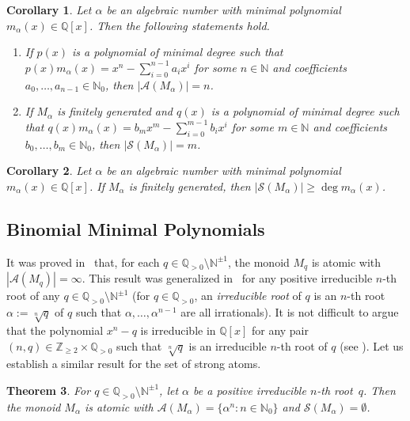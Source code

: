 \documentclass[11pt]{amsart}
\newtheorem{theorem}{Theorem}[section]
\newtheorem{corollary}[theorem]{Corollary}
\theoremstyle{definition}
\theoremstyle{remark}
\numberwithin{equation}{section}
\newcommand{\nn}{\mathbb{N}}
\newcommand{\N}{\mathbb{N}}
\newcommand{\qq}{\mathbb{Q}}
\newcommand{\zz}{\mathbb{Z}}
\begin{document}
\begin{corollary}\label{cor:minimal poly condition for atoms}
    Let $\alpha$ be an algebraic number with minimal polynomial $m_\alpha(x) \in \qq[x]$. Then the following statements hold.
    \begin{enumerate}
        \item If $p(x)$ is a polynomial of minimal degree such that $p(x)m_\alpha(x) = x^n - \sum_{i=0}^{n-1} a_i x^i$ for some $n \in \N$ and coefficients $a_0, \dots, a_{n-1} \in \N_0$, then $|\mathcal{A}(M_\alpha)| = n$.
        \smallskip
        
        \item If $M_\alpha$ is finitely generated and $q(x)$ is a polynomial of minimal degree such that  $q(x)m_\alpha(x) = b_m x^m - \sum_{i=0}^{m-1} b_i x^i$ for some $m \in \N$ and coefficients $b_0, \dots, b_m \in \N_0$, then $|\mathcal{S}(M_\alpha)| = m$.
    \end{enumerate}
\end{corollary}

\begin{corollary}\label{cor:more strong atoms than degree}
    Let $\alpha$ be an algebraic number with minimal polynomial $m_\alpha(x) \in \qq[x]$. If $M_\alpha$ is finitely generated, then $|\mathcal{S}(M_\alpha)| \ge \deg m_\alpha(x)$.
\end{corollary}

\medskip

\subsection{Binomial Minimal Polynomials}

It was proved in~\cite[Theorem~6.2]{GG18} that, for each $q \in \qq_{> 0} \setminus \nn^{\pm 1}$, the monoid $M_q$ is atomic with $|\mathcal{A}(M_q)| = \infty$. This result was generalized in~\cite[Proposition~3.9]{ABLST23} for any positive irreducible $n$-th root of any $q \in \qq_{> 0} \setminus \nn^{\pm 1}$ (for $q \in \qq_{> 0}$, an \emph{irreducible root} of $q$ is an $n$-th root $\alpha := \sqrt[n]{q}$ of $q$ such that $\alpha, \dots, \alpha^{n-1}$ are all irrationals). It is not difficult to argue that the polynomial $x^n - q$ is irreducible in $\qq[x]$ for any pair $(n,q) \in \zz_{\ge 2} \times \qq_{> 0}$ such that $\sqrt[n]{q}$ is an irreducible $n$-th root of $q$ (see \cite[page 297]{sL02}). Let us establish a similar result for the set of strong atoms.

\begin{theorem} \label{thm:strong atoms for irreducible n-th roots}
    For $q \in \qq_{> 0} \setminus \nn^{\pm 1}$, let $\alpha$ be a positive irreducible $n$-th root~$q$. Then the monoid $M_\alpha$ is atomic with $\mathcal{A}(M_\alpha) = \{\alpha^n : n \in \nn_0 \}$ and $\mathcal{S}(M_\alpha) = \emptyset$.
\end{theorem}
\end{document}
